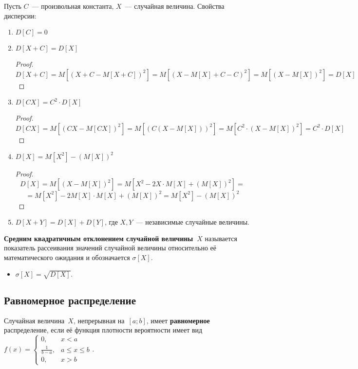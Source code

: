 Пусть $C$~--- произвольная константа, $X$~--- случайная величина.
Свойства дисперсии:
\begin{enumerate}
	\item $D[C] = 0$
	
	\item $D[X + C] = D[X]$
	\begin{proof}
	\begin{equation*}
	D[X + C] =
	M\left[(X + C - M[X + C])^2\right] =
	M\left[(X - M[X] + C - C)^2\right] =
	M\left[(X - M[X])^2\right] =
	D[X]
	\end{equation*}
	\end{proof}
	
	\item $D[CX] = C^2 \cdot D[X]$
	\begin{proof}
	\begin{equation*}
	D[CX] =
	M\left[(CX - M[CX])^2\right] =
	M\left[(C(X - M[X]))^2\right] =
	M\left[C^2 \cdot (X - M[X])^2\right] =
	C^2 \cdot D[X]
	\end{equation*}
	\end{proof}
	
	\item $D[X] = M[X^2] - (M[X])^2$
	\begin{proof}
	\begin{equation*}
	D[X] =
	M\left[(X - M[X])^2\right] =
	M\left[X^2 - 2X \cdot M[X] + (M[X])^2\right] =
	\end{equation*}
	\begin{equation*}
	= M\left[X^2\right] - 2M[X] \cdot M[X] + (M[X])^2 =
	M\left[X^2\right] - (M[X])^2
	\end{equation*}
	\end{proof}
	
	\item $D[X + Y] = D[X] + D[Y]$, где $X, Y$~--- независимые случайные величины.
\end{enumerate}

 \textbf{Средним квадратичным отклонением случайной величины~$X$} называется показатель рассеивания значений случайной величины относительно её математического ожидания и обозначается $\sigma[X]$.
\begin{itemize}
	\item $\displaystyle \sigma[X] = \sqrt{D[X]}$.
\end{itemize}

\subsection{Равномерное распределение}
 Случайная величина~$X$, непрерывная на~$[a; b]$, имеет \textbf{равномерное} распределение, если её функция плотности вероятности имеет вид $f(x) =
\begin{cases}
0, & x < a \\
\frac1{b - a}, & a \leqslant x \leqslant b \\
0, & x > b
\end{cases}$.

